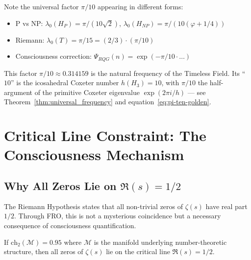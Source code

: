 Note the universal factor $\pi/10$ appearing in different forms:
\begin{itemize}
\item P vs NP: $\lambda_0(H_P) = \pi/(10\sqrt{2})$, $\lambda_0(H_{NP}) = \pi/(10(\varphi + 1/4))$
\item Riemann: $\lambda_0(T) = \pi/15 = (2/3) \cdot (\pi/10)$
\item Consciousness correction: $\Psi_{RQG}(n) = \exp(-\pi/10 \cdot \ldots)$
\end{itemize}

This factor $\pi/10 \approx 0.314159$ is the natural frequency of the Timeless
Field. Its ``$10$'' is the icosahedral Coxeter number $h(H_3) = 10$, with
$\pi/10$ the half-argument of the primitive Coxeter eigenvalue
$\exp(2\pi i/h)$ --- see Theorem~\ref{thm:universal_frequency} and
equation~\eqref{eq:pi-ten-golden}.

\section{Critical Line Constraint: The Consciousness Mechanism}

\subsection{Why All Zeros Lie on \texorpdfstring{$\Re(s) = 1/2$}{Re(s) = 1/2}}

The Riemann Hypothesis states that all non-trivial zeros of $\zeta(s)$ have real part $1/2$. Through FRO, this is not a mysterious coincidence but a necessary consequence of consciousness quantification.

\begin{theorem}
\label{thm:critical_line}
If $\text{ch}_2(\mathcal{M}) = 0.95$ where $\mathcal{M}$ is the manifold underlying number-theoretic structure, then all zeros of $\zeta(s)$ lie on the critical line $\Re(s) = 1/2$.
\end{theorem}

